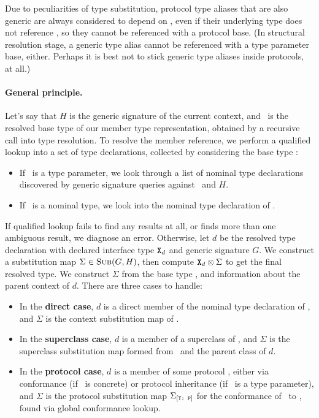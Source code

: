 \documentclass[../generics]{subfiles}
\begin{document}
Due to peculiarities of type substitution, protocol type aliases that are also generic are always considered to depend on \tSelf, even if their underlying type does not reference \tSelf, so they cannot be referenced with a protocol base. (In structural resolution stage, a generic type alias cannot be referenced with a type parameter base, either. Perhaps it is best not to stick generic type aliases inside protocols, at all.)

\paragraph{General principle.} Let's say that $H$ is the generic signature of the current context, and \tT\ is the resolved base type of our member type representation, obtained by a recursive call into type resolution. To resolve the member reference, we perform a qualified lookup into a set of type declarations, collected by considering the base type \tT:
\begin{itemize}
\item If \tT\ is a type parameter, we look through a list of nominal type declarations discovered by generic signature queries against \tT\ and $H$.
\item If \tT\ is a nominal type, we look into the nominal type declaration of \tT.
\end{itemize}
If qualified lookup fails to find any results at all, or finds more than one ambiguous result, we diagnose an error. Otherwise, let $d$ be the resolved type declaration with declared interface type $\texttt{X}_d$ and generic signature $G$. We construct a substitution map $\Sigma\in\textsc{Sub}({G, H})$, then compute $\texttt{X}_d\otimes\Sigma$ to get the final resolved type. We construct $\Sigma$ from the base type \tT, and information about the parent context of $d$. There are three cases to handle:
\begin{itemize}
\item In the \textbf{direct case}, $d$ is a direct member of the nominal type declaration of \tT, and $\Sigma$ is the context substitution map of \tT.
\item In the \textbf{superclass case}, $d$ is a member of a superclass of \tT, and $\Sigma$ is the superclass substitution map formed from \tT\ and the parent class of $d$.
\item In the \textbf{protocol case}, $d$ is a member of some protocol \tP, either via conformance (if \tT\ is concrete) or protocol inheritance (if \tT\ is a type parameter), and $\Sigma$ is the protocol substitution map $\Sigma_{[\texttt{T:~P}]}$ for the conformance of \tT\ to \tP, found via global conformance lookup.
\end{itemize}
\end{document}
